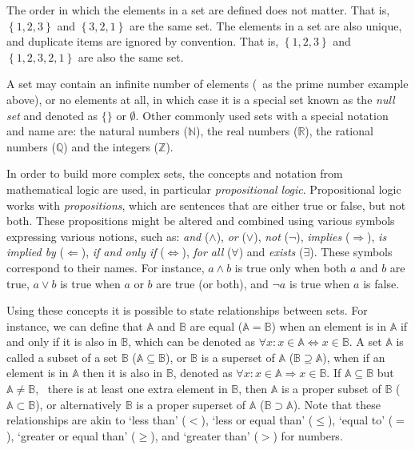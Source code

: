The order in which the elements in a set are defined does not matter.
That is, \(\left\{ 1,2,3 \right\}\) and \(\left\{ 3,2,1 \right\}\) are the same set.
The elements in a set are also unique, and duplicate items are ignored by convention.
That is, \(\left\{ 1,2,3 \right\}\) and \(\left\{ 1,2,3,2,1 \right\}\) are also the same set.

A set may contain an infinite number of elements (\eg\ as the prime number example above), or no elements at all, in which case it is a special set known as the \emph{null set} and denoted as \(\{ \}\) or \(\emptyset\).
Other commonly used sets with a special notation and name are: the natural numbers (\(\mathbb{N}\)), the real numbers (\(\mathbb{R}\)), the rational numbers (\(\mathbb{Q}\)) and the integers (\(\mathbb{Z}\)).

In order to build more complex sets, the concepts and notation from mathematical logic are used, in particular \emph{propositional logic}.
Propositional logic works with \emph{propositions}, which are sentences that are either true or false, but not both.
These propositions might be altered and combined using various symbols expressing various notions, such as: \emph{and} (\(\wedge\)), \emph{or} (\(\vee\)), \emph{not} (\(\neg\)), \emph{implies} (\(\Rightarrow\)), \emph{is implied by} (\(\Leftarrow\)), \emph{if and only if} (\(\Leftrightarrow\)), \emph{for all} (\(\forall\)) and \emph{exists} (\(\exists\)).
These symbols correspond to their names.
For instance, \(a \wedge b\) is true only when both \(a\) and \(b\) are true, \(a \vee b\) is true when \(a\) or \(b\) are true (or both), and \(\neg a\) is true when \(a\) is false.

Using these concepts it is possible to state relationships between sets.
For instance, we can define that \(\mathbb{A}\) and \(\mathbb{B}\) are equal (\(\mathbb{A} = \mathbb{B}\)) when an element is in \(\mathbb{A}\) if and only if it is also in \(\mathbb{B}\), which can be denoted as \(\forall x : x \in \mathbb{A} \Leftrightarrow x \in \mathbb{B}\).
A set \(\mathbb{A}\) is called a subset of a set \(\mathbb{B}\) (\(\mathbb{A} \subseteq \mathbb{B}\)), or \(\mathbb{B}\) is a superset of \(\mathbb{A}\) (\(\mathbb{B} \supseteq \mathbb{A}\)), when if an element is in \(\mathbb{A}\) then it is also in \(\mathbb{B}\), denoted as \(\forall x : x \in \mathbb{A} \Rightarrow x \in \mathbb{B}\).
If \(\mathbb{A} \subseteq \mathbb{B}\) but \(\mathbb{A} \neq \mathbb{B}\), \ie\ there is at least one extra element in \(\mathbb{B}\), then \(\mathbb{A}\) is a proper subset of \(\mathbb{B}\) (\(\mathbb{A} \subset \mathbb{B}\)), or alternatively \(\mathbb{B}\) is a proper superset of \(\mathbb{A}\) (\(\mathbb{B} \supset \mathbb{A}\)).
Note that these relationships are akin to `less than' (\(<\)), `less or equal than' (\(\leq\)), `equal to' (\(=\)), `greater or equal than' (\(\geq\)), and `greater than' (\(>\)) for numbers.

